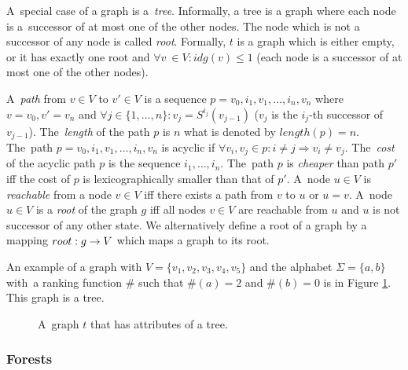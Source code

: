 \documentclass[a4paper, 12pt]{article}
\begin{document}
A~special case of a graph is a~\emph{tree}.
Informally, a tree is a graph where each node is
a~successor of at most one of the other nodes.
The node which is not a successor of any node is called \emph{root}.
Formally, $t$ is a graph which is either empty, or it has exactly one root and $\forall v~\in V: idg(v) \leq 1$
(each node is a successor of at most one of the other nodes).

A~\emph{path} from $v\in V$ to $v' \in V$ is a sequence $p=v_0, i_1, v_1, \ldots, i_n, v_n$ where $v=v_0, v' = v_n$
and $\forall j \in \{1,\ldots,n\}: v_j = S^{i_j}(v_{j-1})$ ($v_j$ is the $i_j$-th successor of $v_{j-1}$).
The~\emph{length} of the path $p$ is $n$ what is denoted by $length(p) = n$.
The~path $p=v_0,i_1,v_1,\ldots,i_n,v_n$ is acyclic if $\forall v_i,v_j \in p: i \neq j \Rightarrow v_i \neq v_j$.
The~\emph{cost} of the acyclic path $p$ is the sequence $i_1, \ldots, i_n$.
The~path $p$ is \emph{cheaper} than path $p'$ iff the cost of $p$ is lexicographically smaller than that of $p'$. 
A~node $u \in V$ is \emph{reachable} from a node $v \in V$ iff there exists a path from $v$ to $u$ or $u=v$.
A~node $u \in V$ is a \emph{root} of the graph $g$ iff all nodes $v \in V$ are reachable from $u$
and $u$ is not successor of any other state.
We alternatively define a root of a graph by a mapping $root: g \rightarrow V$
which maps a graph to its root.

An example of a graph with $V=\{v_1,v_2,v_3,v_4,v_5\}$ and
the alphabet $\Sigma = \{a,b\}$ with~a ranking function $\#$ such that $\#(a) = 2$ and $\#(b) = 0$
is in Figure \ref{fig:graph_tree}.
This graph is a tree.

	\begin{figure}[bth]
		\begin{center}
			
		\end{center}
		\caption{A~graph $t$ that has attributes of a tree.}
		\label{fig:graph_tree}
	\end{figure}
	\label{ex:graph}

\subsubsection{Forests}
\label{subsec:forests}
\end{document}

